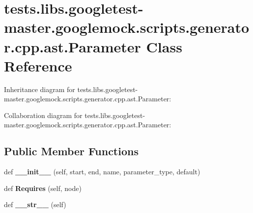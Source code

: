 \hypertarget{classtests_1_1libs_1_1googletest-master_1_1googlemock_1_1scripts_1_1generator_1_1cpp_1_1ast_1_1Parameter}{}\section{tests.\+libs.\+googletest-\/master.googlemock.\+scripts.\+generator.\+cpp.\+ast.\+Parameter Class Reference}
\label{classtests_1_1libs_1_1googletest-master_1_1googlemock_1_1scripts_1_1generator_1_1cpp_1_1ast_1_1Parameter}


Inheritance diagram for tests.\+libs.\+googletest-\/master.googlemock.\+scripts.\+generator.\+cpp.\+ast.\+Parameter\+:


Collaboration diagram for tests.\+libs.\+googletest-\/master.googlemock.\+scripts.\+generator.\+cpp.\+ast.\+Parameter\+:
\subsection*{Public Member Functions}
\begin{DoxyCompactItemize}
\item 
\mbox{\label{classtests_1_1libs_1_1googletest-master_1_1googlemock_1_1scripts_1_1generator_1_1cpp_1_1ast_1_1Parameter_a26acf930452ac55d2b7e0a28b7d35b8d}} 
def {\bfseries \+\_\+\+\_\+init\+\_\+\+\_\+} (self, start, end, name, parameter\+\_\+type, default)
\item 
\mbox{\label{classtests_1_1libs_1_1googletest-master_1_1googlemock_1_1scripts_1_1generator_1_1cpp_1_1ast_1_1Parameter_a2a23ac746b792354656c8a70c225e7e8}} 
def {\bfseries Requires} (self, node)
\item 
\mbox{\label{classtests_1_1libs_1_1googletest-master_1_1googlemock_1_1scripts_1_1generator_1_1cpp_1_1ast_1_1Parameter_aef01c9a1c29e8c5feebcc281023bb04d}} 
def {\bfseries \+\_\+\+\_\+str\+\_\+\+\_\+} (self)
\end{DoxyCompactItemize}
